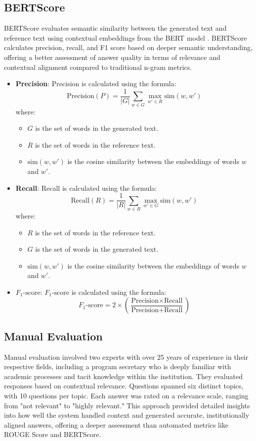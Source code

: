 \documentclass[runningheads]{llncs}
\begin{document}
\subsection{BERTScore}
BERTScore evaluates semantic similarity between the generated text and reference text using contextual embeddings from the BERT model \cite{Zhang2020}. BERTScore calculates precision, recall, and F1 score based on deeper semantic understanding, offering a better assessment of answer quality in terms of relevance and contextual alignment compared to traditional n-gram metrics.
\begin{itemize}
    \item \textbf{Precision}: Precision is calculated using the formula:
    \[
    \text{Precision} (P) = \frac{1}{|G|} \sum_{w \in G} \max_{w' \in R} \text{sim}(w, w')
    \]
    where:
    \begin{itemize}
      \item \( G \) is the set of words in the generated text.
      \item \( R \) is the set of words in the reference text.
      \item \( \text{sim}(w, w') \) is the cosine similarity between the embeddings of words \( w \) and \( w' \).
    \end{itemize}

    \item \textbf{Recall}: Recall is calculated using the formula:
    \[
    \text{Recall} (R) = \frac{1}{|R|} \sum_{w \in R} \max_{w' \in G} \text{sim}(w, w')
    \]
    where:
    \begin{itemize}
      \item \( R \) is the set of words in the reference text.
      \item \( G \) is the set of words in the generated text.
      \item \( \text{sim}(w, w') \) is the cosine similarity between the embeddings of words \( w \) and \( w' \).
    \end{itemize}

    \item \textbf{\( F_{1}\text{-score} \)}: 
    \( F_{1}\text{-score} \) is calculated using the formula:
    \[
    F_{1}\text{-score} = 2 \times \left( \frac{\text{Precision} \times \text{Recall}}{\text{Precision} + \text{Recall}} \right)
    \]
\end{itemize}
    
\subsection{Manual Evaluation}
Manual evaluation involved two experts with over  25 years of experience in their respective fields, including a program secretary who is deeply familiar with academic processes and tacit knowledge within the institution. They evaluated responses based on contextual relevance. Questions spanned six distinct topics, with 10 questions per topic. Each answer was rated on a relevance scale, ranging from "not relevant" to "highly relevant." This approach provided detailed insights into how well the system handled context and generated accurate, institutionally aligned answers, offering a deeper assessment than automated metrics like ROUGE Score and BERTScore.
\end{document}
